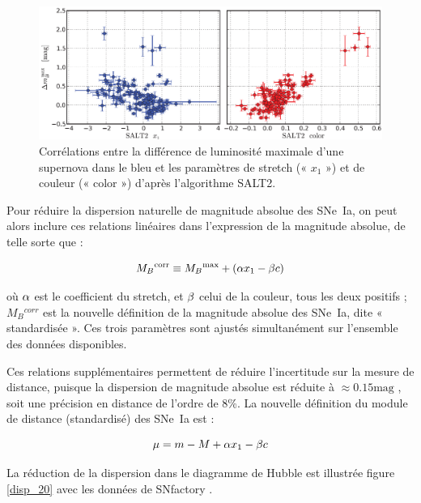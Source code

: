 \documentclass[a4paper, 12pt, svgnames]{article}
\begin{document}
\begin{figure}[htbp!]
    \centering
    \includegraphics[width=.8\linewidth]{Rapport_figures/disp_x1_c.PNG}
    \captionsetup{justification=centering}
    \caption{Corrélations entre la différence de luminosité maximale d'une
    supernova dans le bleu et les paramètres de stretch (« $x_1$ ») et de
couleur (« color ») d'après l'algorithme SALT2.}
    \label{brighter_slower_bluer}
\end{figure}

Pour réduire la dispersion naturelle de magnitude absolue des SNe~Ia, on peut
alors inclure ces relations linéaires dans l'expression de la magnitude absolue,
de telle sorte que :

\begin{equation}
    M_B{}^{\text{corr}} \equiv M_B{}^{\text{max}} + \left(\alpha x_1 - \beta c\right)
\end{equation}

où $\alpha$ est le coefficient du stretch, et $\beta$ celui de la couleur, tous les
deux positifs ; $M_B{}^{corr}$ est la nouvelle définition de la magnitude
absolue des SNe~Ia, dite « standardisée ». Ces trois paramètres sont ajustés
simultanément sur l'ensemble des données disponibles. \bigbreak

Ces relations supplémentaires permettent de réduire l'incertitude sur la
mesure de distance, puisque la dispersion de magnitude absolue est réduite à
$\approx 0.15 \mathrm{mag}$ \cite{betoule_improved_2014}, soit une précision en
distance de l'ordre de 8\%. La nouvelle définition du module de distance
(standardisé) des SNe~Ia est :

\begin{equation}
    \mu = m - M +\alpha x_1 - \beta c
\end{equation}

La réduction de la dispersion dans le diagramme de Hubble est illustrée figure
\ref{disp_20} avec les données de SNfactory \cite{rigault_strong_2018}.
\bigbreak
\end{document}
